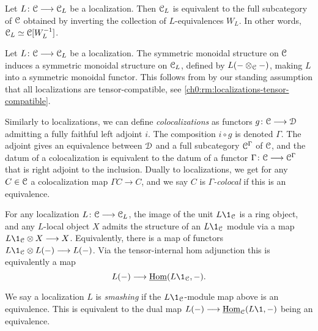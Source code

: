 \begin{proposition}
    Let $L\colon \EuScript{C}\longrightarrow \EuScript{C}_L$ be a localization. Then $\EuScript{C}_L$ is equivalent to the full subcategory of $\EuScript{C}$ obtained by inverting the collection of $L$-equivalences $W_L$. In other words, $\EuScript{C}_L\simeq \EuScript{C}[W_L^{-1}]$.
\end{proposition}

\begin{remark}
    \label{ch0:rm:monoidal-localization}
    Let $L\colon \EuScript{C}\longrightarrow \EuScript{C}_L$ be a localization. The symmetric monoidal structure on $\EuScript{C}$ induces a symmetric monoidal structure on $\EuScript{C}_L$, defined by $L(-\otimes_{\EuScript{C}} -)$, making $L$ into a symmetric monoidal functor. This follows from \cite[2.2.1.9]{Lurie_HA} by our standing assumption that all localizations are tensor-compatible, see \cref{ch0:rm:localizations-tensor-compatible}. 
\end{remark}

\begin{remark}
    Similarly to localizations, we can define \emph{colocalizations} as functors $g\colon \EuScript{C}\longrightarrow \EuScript{D}$ admitting a fully faithful left adjoint $i$. The composition $i\circ g$ is denoted $\Gamma$. The adjoint gives an equivalence between $\EuScript{D}$ and a full subcategory $\EuScript{C}^\Gamma$ of $\EuScript{C}$, and the datum of a colocalization is equivalent to the datum of a functor $\Gamma\colon \EuScript{C}\longrightarrow \EuScript{C}^\Gamma$ that is right adjoint to the inclusion. Dually to localizations, we get for any $C\in \EuScript{C}$ a colocalization map $\Gamma C\to C$, and we say $C$ is \emph{$\Gamma$-colocal} if this is an equivalence. 
\end{remark}

For any localization $L\colon \EuScript{C}\longrightarrow \EuScript{C}_L$, the image of the unit $L\1_\C$ is a ring object, and any $L$-local object $X$ admits the structure of an $L\1_\C$ module via a map $L\1_\C\otimes X \longrightarrow X$. Equivalently, there is a map of functors $L\1_\C \otimes L(-)\longrightarrow L(-)$. Via the tensor-internal hom adjunction this is equivalently a map 
\[L(-)\longrightarrow \iHom(L\1_\C,-).\]

\begin{definition}
    \label{ch0:def:smashing-localization}
    We say a localization $L$ is \emph{smashing} if the $L\1_\C$-module map above is an equivalence. This is equivalent to the dual map $L(-)\longrightarrow \iHom_\C(L\1, -)$ being an equivalence. 
\end{definition}

